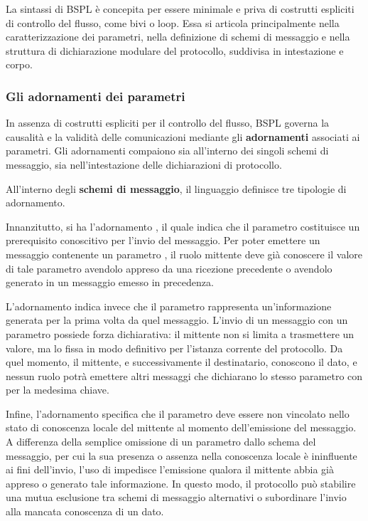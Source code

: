 La sintassi di BSPL è concepita per essere minimale e priva di costrutti espliciti di controllo del flusso,
come bivi o loop. Essa si articola principalmente nella caratterizzazione dei parametri, nella definizione 
di schemi di messaggio e nella struttura di dichiarazione modulare del protocollo, suddivisa in intestazione
e corpo.

\subsubsection{Gli adornamenti dei parametri}\label{bspl:adornamenti}

In assenza di costrutti espliciti per il controllo del flusso, BSPL governa la causalità e 
la validità delle comunicazioni mediante gli \textbf{adornamenti} associati ai parametri. 
Gli adornamenti compaiono sia all'interno dei singoli schemi di messaggio, sia nell'intestazione 
delle dichiarazioni di protocollo.

All'interno degli \textbf{schemi di messaggio}, il linguaggio definisce tre tipologie di adornamento.

Innanzitutto, si ha l'adornamento \textbf{}, il quale indica che il parametro 
costituisce un prerequisito conoscitivo per l'invio del messaggio. Per poter emettere un
messaggio contenente un parametro , il ruolo mittente
deve già conoscere il valore di tale parametro avendolo appreso da una ricezione 
precedente o avendolo generato in un messaggio emesso in precedenza.

L'adornamento \textbf{} indica invece che il parametro 
rappresenta un'informazione generata per la prima volta da quel 
messaggio. L'invio di un messaggio con un parametro  possiede 
forza dichiarativa: il mittente non si limita a trasmettere un valore, ma lo fissa in 
modo definitivo per l'istanza corrente del protocollo. Da quel momento, il mittente, e 
successivamente il destinatario, conoscono il dato, e nessun ruolo potrà emettere altri 
messaggi che dichiarano lo stesso parametro con  per la 
medesima chiave.

Infine, l'adornamento \textbf{} specifica che il parametro
deve essere non vincolato nello stato di conoscenza locale del mittente al momento 
dell'emissione del messaggio.
A differenza della semplice omissione di un parametro dallo schema del messaggio, per cui 
la sua presenza o assenza nella conoscenza locale è ininfluente ai fini dell'invio, 
l'uso di  impedisce l'emissione qualora il mittente abbia già appreso o generato 
tale informazione. In questo modo, il protocollo può stabilire una mutua esclusione 
tra schemi di messaggio alternativi o subordinare l'invio alla mancata conoscenza di un dato.

